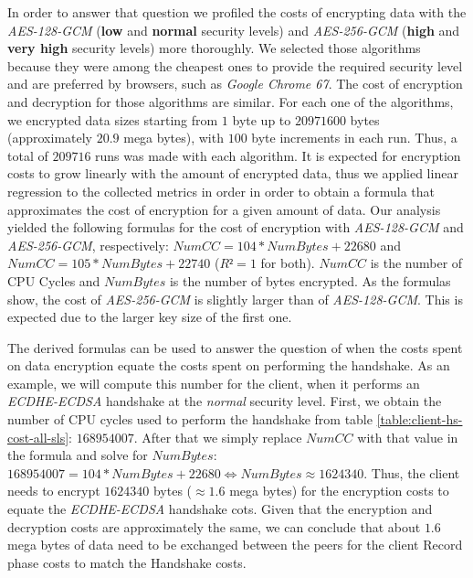 In order to answer that question we profiled the costs of encrypting data with the \textit{AES-128-GCM} (\textbf{low} and 
\textbf{normal} security levels) and \textit{AES-256-GCM} (\textbf{high} and \textbf{very high} security levels) more thoroughly. 
We selected those algorithms because they were among the cheapest ones to provide the required security level and are preferred by
browsers, such as \textit{Google Chrome 67}. The cost of encryption and decryption for those algorithms are similar\cite{ertaul2016performance}.
For each one of the algorithms, we encrypted data sizes starting from $1$ byte up to $20971600$ bytes (approximately $20.9$ mega bytes),
with $100$ byte increments in each run. Thus, a total of $209716$ runs was made with each algorithm. It is expected for encryption costs to
grow linearly with the amount of encrypted data, thus we applied linear regression to the collected metrics in order in order to
obtain a formula that approximates the cost of encryption for a given amount of data. Our analysis yielded the following formulas for the
cost of encryption with \textit{AES-128-GCM} and \textit{AES-256-GCM}, respectively: $NumCC=104*NumBytes+22680$ and $NumCC=105*NumBytes+22740$ ($R²=1$ for both).
$NumCC$ is the number of CPU Cycles and $NumBytes$ is the number of bytes encrypted. As the formulas show, the cost of \textit{AES-256-GCM} is slightly
larger than of \textit{AES-128-GCM}. This is expected due to the larger key size of the first one.

The derived formulas can be used to answer the question of when the costs spent on data encryption equate the costs
spent on performing the handshake. As an example, we will compute this number for the client, when it performs an
\textit{ECDHE-ECDSA} handshake at the \textit{normal} security level. First, we obtain the number of CPU cycles
used to perform the handshake from table \ref{table:client-hs-cost-all-sls}: $168954007$. After that we simply
replace $NumCC$ with that value in the formula and solve for $NumBytes$: $168954007=104*NumBytes+22680 \Leftrightarrow NumBytes \approx 1624340$.
Thus, the client needs to encrypt $1624340$ bytes ($\approx 1.6$ mega bytes) for the encryption costs to equate the \textit{ECDHE-ECDSA} handshake cots.
Given that the encryption and decryption costs are approximately the same, we can conclude that about $1.6$ mega bytes of data need to be exchanged between the
peers for the client Record phase costs to match the Handshake costs.

